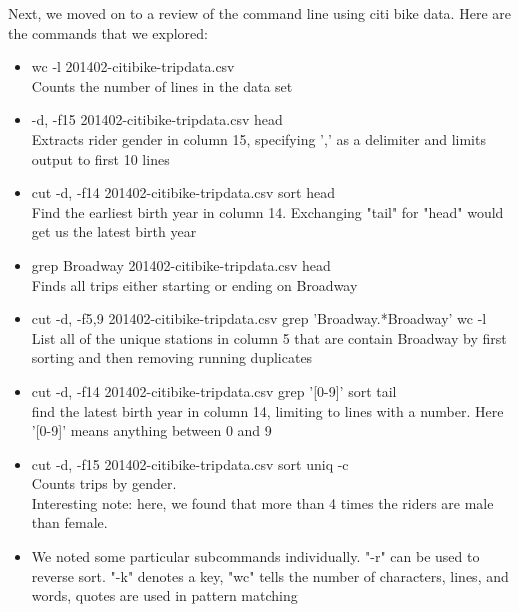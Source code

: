 Next, we moved on to a review of the command line using citi bike data. Here are the commands that we explored:
\begin{itemize}
    \item wc -l 201402-citibike-tripdata.csv \\
    Counts the number of lines in the data set
    \item -d, -f15 201402-citibike-tripdata.csv \textbar head \\
    Extracts rider gender in column 15, specifying ',' as a delimiter and limits output to first 10 lines
    \item cut -d, -f14 201402-citibike-tripdata.csv \textbar sort \textbar head \\
    Find the earliest birth year in column 14. Exchanging "tail" for "head" would get us the latest birth year
    \item grep Broadway 201402-citibike-tripdata.csv \textbar head \\
    Finds all trips either starting or ending on Broadway
    \item cut -d, -f5,9 201402-citibike-tripdata.csv \textbar grep 'Broadway.*Broadway' \textbar wc -l \\
    List all of the unique stations in column 5 that are contain Broadway by first sorting and then removing running duplicates
    \item cut -d, -f14 201402-citibike-tripdata.csv \textbar grep '[0-9]' \textbar sort \textbar tail \\
    find the latest birth year in column 14, limiting to lines with a number. Here '[0-9]' means anything between 0 and 9
    \item cut -d, -f15 201402-citibike-tripdata.csv \textbar sort \textbar uniq -c \\
    Counts trips by gender. \\
    Interesting note: here, we found that more than 4 times the riders are male than female.
    \item We noted some particular subcommands individually. "-r" can be used to reverse sort. "-k" denotes a key, "wc" tells the number of characters, lines, and words, quotes are used in pattern matching
\end{itemize}

